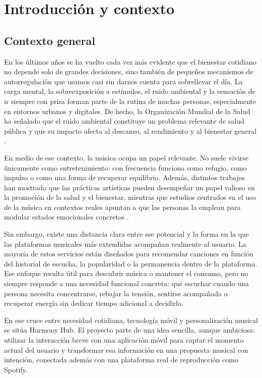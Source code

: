 \chapter{Introducción y contexto}
\label{ch:introduccion}

\section{Contexto general}
\label{sec:contexto_general}

En los últimos años se ha vuelto cada vez más evidente que el bienestar cotidiano no depende solo de grandes decisiones, sino también de pequeños mecanismos de autorregulación que usamos casi sin darnos cuenta para sobrellevar el día. La carga mental, la sobreexposición a estímulos, el ruido ambiental y la sensación de ir siempre con prisa forman parte de la rutina de muchas personas, especialmente en entornos urbanos y digitales. De hecho, la Organización Mundial de la Salud ha señalado que el ruido ambiental constituye un problema relevante de salud pública y que su impacto afecta al descanso, al rendimiento y al bienestar general \cite{who_noise_2018}.

En medio de ese contexto, la música ocupa un papel relevante. No suele vivirse únicamente como entretenimiento: con frecuencia funciona como refugio, como impulso o como una forma de recuperar equilibrio. Además, distintos trabajos han mostrado que las prácticas artísticas pueden desempeñar un papel valioso en la promoción de la salud y el bienestar, mientras que estudios centrados en el uso de la música en contextos reales apuntan a que las personas la emplean para modular estados emocionales concretos \cite{who_arts_2019,thoma2012}.

Sin embargo, existe una distancia clara entre ese potencial y la forma en la que las plataformas musicales más extendidas acompañan realmente al usuario. La mayoría de estos servicios están diseñados para recomendar canciones en función del historial de escucha, la popularidad o la permanencia dentro de la plataforma. Ese enfoque resulta útil para descubrir música o mantener el consumo, pero no siempre responde a una necesidad funcional concreta: qué escuchar cuando una persona necesita concentrarse, rebajar la tensión, sentirse acompañada o recuperar energía sin dedicar tiempo adicional a decidirlo.

En ese cruce entre necesidad cotidiana, tecnología móvil y personalización musical se sitúa Harmony Hub. El proyecto parte de una idea sencilla, aunque ambiciosa: utilizar la interacción breve con una aplicación móvil para captar el momento actual del usuario y transformar esa información en una propuesta musical con intención, conectada además con una plataforma real de reproducción como Spotify.

